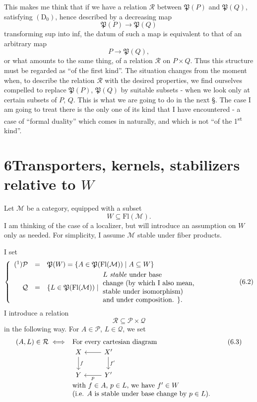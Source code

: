 \documentclass[11pt]{article}
\newcommand{\printedpage}[1]{\marginpar{\footnotesize p.~#1}}
\newcommand{\msp}[1]{\marginpar{\footnotesize [#1]}}
\newcommand{\Fl}{\mathrm{Fl}}
\newcommand{\Pf}{\mathfrak{P}}
\begin{document}
This makes me think that if we have a relation $\mathcal{R}$ between $\Pf(P)$ and $\Pf(Q)$, satisfying $(\mathrm{D}_0)$, hence described by a decreasing map
\[
\Pf(P)\longrightarrow\Pf(Q)
\]
transforming sup into inf, the datum of such a map is equivalent to that of an arbitrary map %
\[
P\longrightarrow\Pf(Q),
\]
or what amounts to the same thing, of a relation $\mathcal{R}$ on $P\times Q$. Thus this structure must be regarded as ``of the first kind''. The situation changes from the moment when, to describe the relation $\mathcal{R}$ with the desired properties, we find ourselves compelled to replace $\Pf(P)$, $\Pf(Q)$ by suitable subsets - when we look only at certain subsets of $P$, $Q$. This is what we
\msp{page 83}are going to do in the next §. The case I am going to treat there is the only one of its kind that I have encountered - a case of ``formal duality'' which comes in naturally, and which is not ``of the 1\textsuperscript{st} kind''.

\printedpage{51}
\section*{6\quad Transporters, kernels, stabilizers relative to $W$}

Let $\mathcal{M}$ be a category, equipped with a subset
\[
W\subseteq\Fl(\mathcal{M}).
\tag*{(6.1)}
\]
I am thinking of the case of a localizer, but will introduce an assumption on $W$ only as needed. For simplicity, I assume $\mathcal{M}$ stable under fiber products.

I set
\[
\left\{
\begin{array}{rcl}
\mbox{(\footnotemark)}\mathcal{P} & = & \Pf(W)=\{A\in\Pf(\Fl(\mathcal{M}))\mid A\subseteq W\}\\[1ex]
\mathcal{Q} & = & \{L\in\Pf(\Fl(\mathcal{M}))\mid\
\parbox[c]{17em}{$L$ \textit{stable} under base\\
change (by which I also mean,\\
stable under isomorphism)\\
and under composition. $\}$.}
\end{array}
\right.
\tag*{(6.2)}
\]
I introduce a relation
\[
\mathcal{R}\subseteq\mathcal{P}\times\mathcal{Q}
\]
in the following way. For $A\in\mathcal{P}$, $L\in\mathcal{Q}$, we set
\[
(A,L)\in\mathcal{R}\iff
\begin{array}[t]{l}
\text{For every cartesian diagram}\\
\begin{tikzcd}[ampersand replacement=\&]
X \arrow[d, "f"] \& X' \arrow[l] \arrow[d, "f'"] \\
Y \& Y' \arrow[l, "p"]
\end{tikzcd}\\
\text{with $f\in A$, $p\in L$, we have $f'\in W$}\\
\text{(i.e. $A$ is stable under base change by $p\in L$).}
\end{array}
\tag*{(6.3)}
\]
\end{document}
